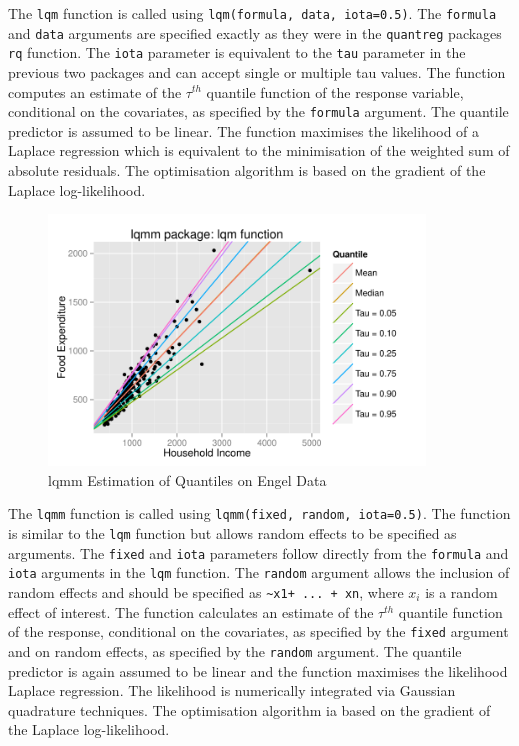 \documentclass[12pt,a4paper]{report}
\begin{document}
The {\small\verb"lqm"} function is called using {\small\verb"lqm(formula, data, iota=0.5)"}. The {\small\verb"formula"} and {\small\verb"data"} arguments are specified exactly as they were in the {\small\verb"quantreg"} packages {\small\verb"rq"} function. The {\small\verb"iota"} parameter is equivalent to the {\small\verb"tau"} parameter in the previous two packages and can accept single or multiple tau values. The function computes an estimate of the $\tau^{th}$ quantile function of the response variable, conditional on the covariates, as specified by the {\small\verb"formula"} argument. The quantile predictor is assumed to be linear. The function maximises the likelihood of a Laplace regression which is equivalent to the minimisation of the weighted sum of absolute residuals. The optimisation algorithm is based on the gradient of the Laplace log-likelihood.
\vspace{2mm}

\begin{figure}[ht]\centering
    \includegraphics[width=10cm]{PlotofLqmm.pdf}
    \caption{lqmm Estimation of Quantiles on Engel Data}
    \label{plot:lqmm-example}
\end{figure}

The {\small\verb"lqmm"} function is called using {\small\verb"lqmm(fixed, random, iota=0.5)"}. The function is similar to the {\small\verb"lqm"} function but allows random effects to be specified as arguments. The {\small\verb"fixed"} and {\small\verb"iota"} parameters follow directly from the {\small\verb"formula"} and {\small\verb"iota"} arguments in the {\small\verb"lqm"} function. The {\small\verb"random"} argument allows the inclusion of random effects and should be specified as {\small\verb"~x1+ ... + xn"}, where $x_{i}$ is a random effect of interest. The function calculates an estimate of the $\tau^{th}$ quantile function of the response, conditional on the covariates, as specified by the {\small\verb"fixed"} argument and on random effects, as specified by the {\small\verb"random"} argument. The quantile predictor is again assumed to be linear and the function maximises the likelihood Laplace regression. The likelihood is numerically integrated via Gaussian quadrature techniques. The optimisation algorithm ia based on the gradient of the Laplace log-likelihood.
\vspace{2mm}
\end{document}
